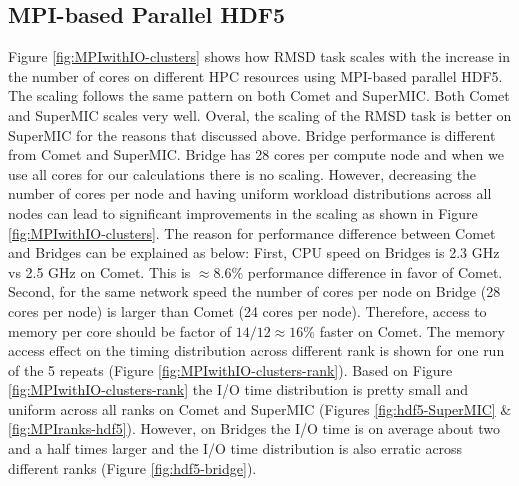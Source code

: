 \subsection{MPI-based Parallel HDF5}
Figure \ref{fig:MPIwithIO-clusters} shows how RMSD task scales with the increase in the number of cores on different HPC resources using MPI-based parallel HDF5.  
The scaling follows the same pattern on both Comet and SuperMIC. 
Both Comet and SuperMIC scales very well.
Overal, the scaling of the RMSD task is better on SuperMIC for the reasons that discussed above.
Bridge performance is different from Comet and SuperMIC.
Bridge has 28 cores per compute node and when we use all cores for our calculations there is no scaling.
However, decreasing the number of cores per node and having uniform workload distributions across all nodes can lead to significant improvements in the scaling as shown in Figure \ref{fig:MPIwithIO-clusters}.
The reason for performance difference between Comet and Bridges can be explained as below:
First, CPU speed on Bridges is 2.3 GHz vs 2.5 GHz on Comet. This is $\approx 8.6\%$ performance difference in favor of Comet. 
Second, for the same network speed the number of cores per node on Bridge (28 cores per node) is larger than Comet (24 cores per node). 
Therefore, access to memory per core should be factor of $14/12 \approx 16\%$ faster on Comet.
The memory access effect on the timing distribution across different rank is shown for one run of the 5 repeats (Figure \ref{fig:MPIwithIO-clusters-rank}).
Based on Figure \ref{fig:MPIwithIO-clusters-rank} the I/O time distribution is pretty small and uniform across all ranks on Comet and SuperMIC (Figures \ref{fig:hdf5-SuperMIC} \& \ref{fig:MPIranks-hdf5}).
However, on Bridges the I/O time is on average about two and a half times larger and the I/O time distribution is also erratic across different ranks (Figure \ref{fig:hdf5-bridge}).  


